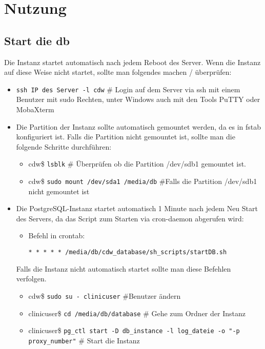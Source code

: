 \chapter{Nutzung}
	   \section{Start die \acs{db}}
	   Die Instanz startet automatisch nach jedem Reboot des Server. Wenn die Instanz auf diese Weise nicht startet, sollte man folgendes machen / überprüfen:
	   \begin{itemize}
	   	\item \texttt{ssh IP des Server -l cdw} \# Login auf dem Server via ssh mit einem Benutzer mit sudo Rechten, unter Windows auch mit den Tools PuTTY oder MobaXterm
	   	\item Die Partition der Instanz sollte automatisch gemountet werden, da es in fstab konfiguriert ist. Falls die Partition nicht gemountet ist, sollte man die folgende Schritte durchführen:
	   	\begin{itemize}
	   	 \item cdw\$ \texttt{lsblk} \# Überprüfen ob die Partition /dev/sdb1 gemountet ist.
	   	 \item cdw\$ \texttt{sudo mount /dev/sda1 /media/db} \#Falls die Partition /dev/sdb1 nicht gemountet ist
	   	\end{itemize}	   	  
	   	\item Die PostgreSQL-Instanz startet automatisch 1 Minute nach jedem Neu Start des Servers, da das Script zum Starten via cron-daemon abgerufen wird:
	   	\begin{itemize}
	   		\item Befehl in crontab: 
	   		
	   		\texttt{* * * * * /media/db/cdw\_database/sh\_scripts/startDB.sh}
	   	\end{itemize}
	   	Falls die Instanz nicht automatisch startet sollte man diese Befehlen verfolgen.
	   	\begin{itemize}
	   		\item cdw\$ \texttt{sudo su - clinicuser} \#Benutzer ändern
	   		\item clinicuser\$ \texttt{cd /media/db/database} \# Gehe zum Ordner der  Instanz
	   	    \item clinicuser\$ \texttt{pg\_ctl start -D db\_instance -l log\_dateie -o "-p proxy\_number"} \# Start die Instanz
	   	\end{itemize}
	   \end{itemize}
